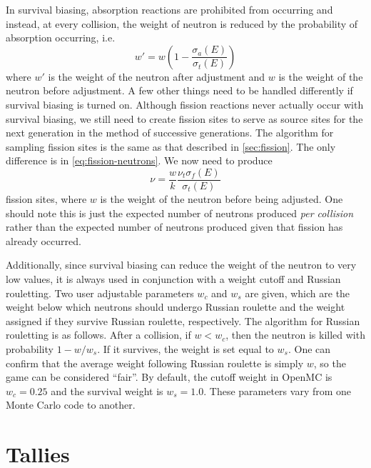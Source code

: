 In survival biasing, absorption reactions are prohibited from occurring and
instead, at every collision, the weight of neutron is reduced by the probability
of absorption occurring, i.e.
\begin{equation}
  \label{eq:survival-biasing-weight}
  w' = w \left ( 1 - \frac{\sigma_a (E)}{\sigma_t (E)} \right )
\end{equation}
where $w'$ is the weight of the neutron after adjustment and $w$ is the weight
of the neutron before adjustment. A few other things need to be handled
differently if survival biasing is turned on. Although fission reactions never
actually occur with survival biasing, we still need to create fission sites to
serve as source sites for the next generation in the method of successive
generations. The algorithm for sampling fission sites is the same as that
described in \autoref{sec:fission}. The only difference is in
\eqref{eq:fission-neutrons}. We now need to produce
\begin{equation}
  \label{eq:fission-neutrons-survival}
  \nu = \frac{w}{k} \frac{\nu_t \sigma_f(E)}{\sigma_t (E)}
\end{equation}
fission sites, where $w$ is the weight of the neutron before being adjusted. One
should note this is just the expected number of neutrons produced \emph{per
  collision} rather than the expected number of neutrons produced given that
fission has already occurred.

Additionally, since survival biasing can reduce the weight of the neutron to
very low values, it is always used in conjunction with a weight cutoff and
Russian rouletting. Two user adjustable parameters $w_c$ and $w_s$ are given,
which are the weight below which neutrons should undergo Russian roulette and
the weight assigned if they survive Russian roulette, respectively. The
algorithm for Russian rouletting is as follows. After a collision, if $w < w_c$,
then the neutron is killed with probability $1 - w/w_s$. If it survives, the
weight is set equal to $w_s$. One can confirm that the average weight following
Russian roulette is simply $w$, so the game can be considered ``fair''. By
default, the cutoff weight in OpenMC is $w_c = 0.25$ and the survival weight is
$w_s = 1.0$. These parameters vary from one Monte Carlo code to another.

\section{Tallies}
\label{sec:tallies}

